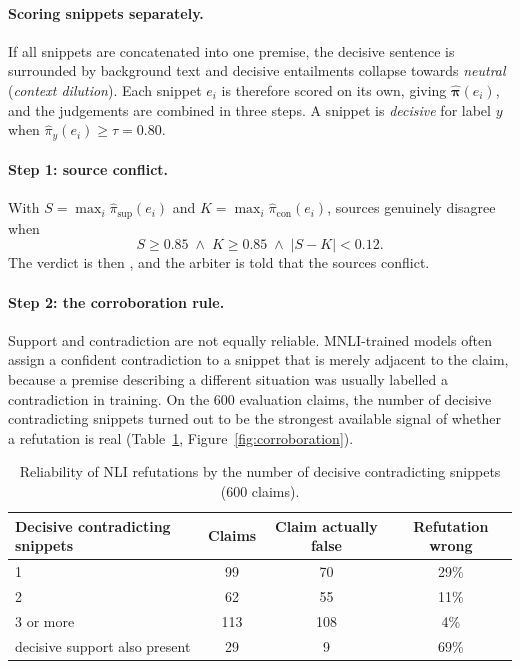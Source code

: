 \paragraph{Scoring snippets separately.} If all snippets are concatenated into one premise, the decisive sentence is surrounded by background text and decisive entailments collapse towards \emph{neutral} (\emph{context dilution}). Each snippet $e_i$ is therefore scored on its own, giving $\hat{\bm{\pi}}(e_i)$, and the judgements are combined in three steps. A snippet is \emph{decisive} for label $y$ when $\hat{\pi}_y(e_i) \ge \tau = 0.80$.

\paragraph{Step 1: source conflict.} With $S = \max_i \hat{\pi}_{\text{sup}}(e_i)$ and $K = \max_i \hat{\pi}_{\text{con}}(e_i)$, sources genuinely disagree when
\begin{equation}
  S \ge 0.85 \;\wedge\; K \ge 0.85 \;\wedge\; \lvert S - K \rvert < 0.12 .
\end{equation}
The verdict is then \Unk, and the arbiter is told that the sources conflict.

\paragraph{Step 2: the corroboration rule.} Support and contradiction are not equally reliable. MNLI-trained models often assign a confident contradiction to a snippet that is merely adjacent to the claim, because a premise describing a different situation was usually labelled a contradiction in training. On the 600 evaluation claims, the number of decisive contradicting snippets turned out to be the strongest available signal of whether a refutation is real (Table~\ref{tab:corroboration}, Figure~\ref{fig:corroboration}).

\begin{table}[htbp]
\centering
\caption{Reliability of NLI refutations by the number of decisive contradicting snippets (600 claims).}
\label{tab:corroboration}
\begin{tabular}{@{}lccc@{}}
\toprule
Decisive contradicting snippets & Claims & Claim actually false & Refutation wrong \\
\midrule
1 & 99 & 70 & 29\% \\
2 & 62 & 55 & 11\% \\
3 or more & 113 & 108 & 4\% \\
decisive support also present & 29 & 9 & 69\% \\
\bottomrule
\end{tabular}
\end{table}

